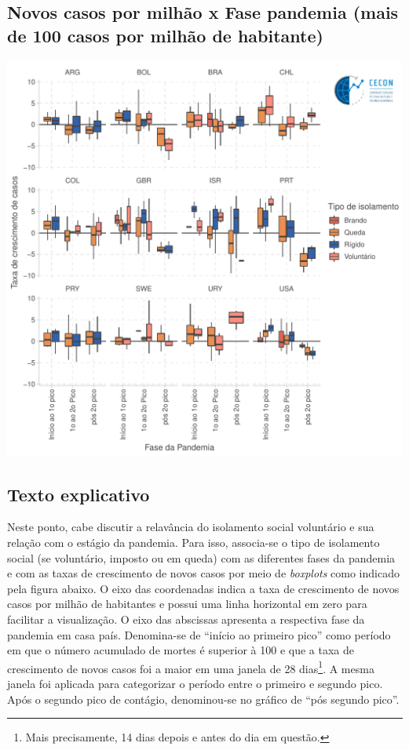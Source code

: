 \documentclass{SelfArx}
\begin{document}
\subsection*{Novos casos por milhão x Fase pandemia (mais de 100 casos por milhão de habitante)}
\label{sec:org80e6c00}

\begin{center}
\includegraphics[width=.9\linewidth]{./figs/COVID/Casos_Policy_100_Todos.pdf}
\end{center}


\subsection*{Texto explicativo}
\label{sec:org02ec251}

Neste ponto, cabe discutir a relavância do isolamento social voluntário e sua relação com o estágio da pandemia.
Para isso, associa-se o tipo de isolamento social (se voluntário, imposto ou em queda) com as diferentes fases da pandemia e com as taxas de crescimento de novos casos por meio de \emph{boxplots} como indicado pela figura abaixo.
O eixo das coordenadas indica a taxa de crescimento de novos casos por milhão de habitantes e possui uma linha horizontal em zero para facilitar a visualização.
O eixo das abscissas apresenta a respectiva fase da pandemia em casa país.
Denomina-se de ``início ao primeiro pico'' como período em que o número acumulado de mortes é superior à 100 e que a taxa de crescimento de novos casos foi a maior em uma janela de 28 dias\footnote{Mais precisamente, 14 dias depois e antes do dia em questão.}.
A mesma janela foi aplicada para categorizar o período entre o primeiro e segundo pico.
Após o segundo pico de contágio, denominou-se no gráfico de ``pós segundo pico''.
\end{document}
